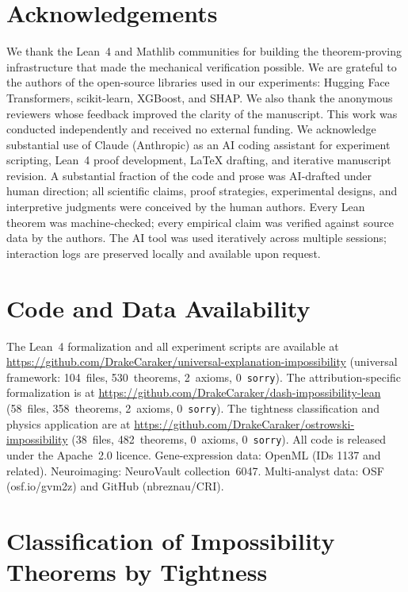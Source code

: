 \documentclass[11pt,a4paper]{article}
\begin{document}
\section*{Acknowledgements}

We thank the Lean~4 and Mathlib communities for building the theorem-proving
infrastructure that made the mechanical verification possible.  We are grateful
to the authors of the open-source libraries used in our experiments: Hugging
Face Transformers, scikit-learn, XGBoost, and SHAP.  We also thank the
anonymous reviewers whose feedback improved the clarity of the manuscript.
This work was conducted independently and received no external funding.
We acknowledge substantial use of Claude (Anthropic) as an AI coding
assistant for experiment scripting, Lean~4 proof development, LaTeX
drafting, and iterative manuscript revision.  A substantial fraction of
the code and prose was AI-drafted under human direction; all scientific
claims, proof strategies, experimental designs, and interpretive
judgments were conceived by the human authors.  Every Lean theorem was
machine-checked; every empirical claim was verified against source data
by the authors.  The AI tool was used iteratively across multiple sessions;
interaction logs are preserved locally and available upon request.

\section*{Code and Data Availability}

The Lean~4 formalization and all experiment scripts are available at
\url{https://github.com/DrakeCaraker/universal-explanation-impossibility}
(universal framework: 104~files, 530~theorems, 2~axioms, 0~\texttt{sorry}).
The attribution-specific formalization is at
\url{https://github.com/DrakeCaraker/dash-impossibility-lean}
(58~files, 358~theorems, 2~axioms, 0~\texttt{sorry}).
The tightness classification and physics application are at
\url{https://github.com/DrakeCaraker/ostrowski-impossibility}
(38~files, 482~theorems, 0~axioms, 0~\texttt{sorry}).
All code is released under the Apache~2.0 licence.
Gene-expression data: OpenML (IDs 1137 and related).
Neuroimaging: NeuroVault collection~6047.
Multi-analyst data: OSF (osf.io/gvm2z) and GitHub (nbreznau/CRI).

\section{Classification of Impossibility Theorems by Tightness}
\label{sec:classification}
\end{document}
